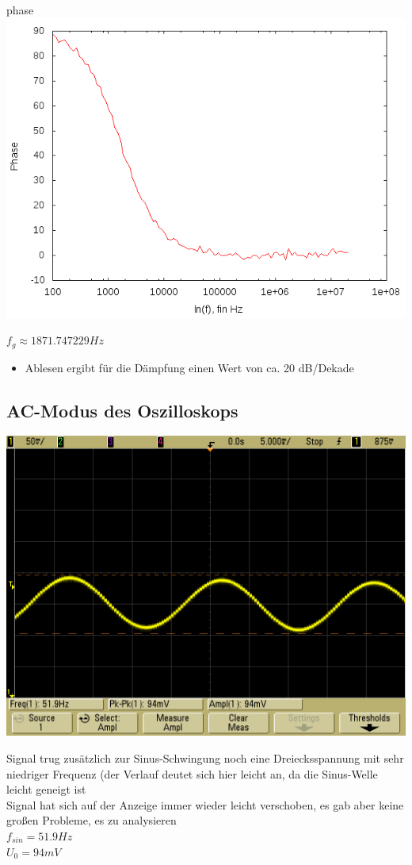 \documentclass[compress,11pt]{beamer}
\begin{document}
\begin{frame}
\begin{block}{phase}
\includegraphics[width=.85\textwidth]{../daten/Messdaten/plots/Aufgabe2Bodediagramm_hochpass_phase}

\end{block}
$f_g \approx  1871.747229 Hz$
\end{frame}
\begin{frame}
\begin{itemize}
\item Ablesen ergibt für die Dämpfung einen Wert von ca. 20 dB/Dekade
\end{itemize}
\end{frame}
\subsection{AC-Modus des Oszilloskops}
\begin{frame}
\includegraphics[width=.9\textwidth]{../daten/scope_16}
\end{frame}
\begin{frame}
Signal trug zusätzlich zur Sinus-Schwingung noch eine Dreiecksspannung mit sehr niedriger Frequenz (der Verlauf deutet sich hier leicht an, da die Sinus-Welle leicht geneigt ist \\
Signal hat sich auf der Anzeige immer wieder leicht verschoben, es gab aber keine großen Probleme, es zu analysieren\\
$f_{sin} = 51.9 Hz$\\
$U_0 = 94 mV$
\end{frame}
\end{document}
